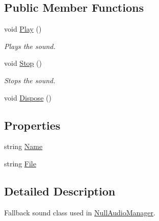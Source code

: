 \subsection*{Public Member Functions}
\begin{DoxyCompactItemize}
\item 
void \hyperlink{class_tri_devs_1_1_tri_engine_1_1_audio_1_1_null_sound_a470512e45c5a7bf069761de5ede5f7e4}{Play} ()
\begin{DoxyCompactList}\small\item\em Plays the sound. \end{DoxyCompactList}\item 
void \hyperlink{class_tri_devs_1_1_tri_engine_1_1_audio_1_1_null_sound_abc5395c18bd298050278547353548b56}{Stop} ()
\begin{DoxyCompactList}\small\item\em Stops the sound. \end{DoxyCompactList}\item 
void \hyperlink{class_tri_devs_1_1_tri_engine_1_1_audio_1_1_null_sound_a4ce71904b5e67108ca4de8b63e8d0fdd}{Dispose} ()
\end{DoxyCompactItemize}
\subsection*{Properties}
\begin{DoxyCompactItemize}
\item 
string \hyperlink{class_tri_devs_1_1_tri_engine_1_1_audio_1_1_null_sound_afa85eab8bcc6d17d162cab5b98937304}{Name}
\item 
string \hyperlink{class_tri_devs_1_1_tri_engine_1_1_audio_1_1_null_sound_aef0aa0ab4f1425b7e5d4144974496aeb}{File}
\end{DoxyCompactItemize}


\subsection{Detailed Description}
Fallback sound class used in \hyperlink{class_tri_devs_1_1_tri_engine_1_1_audio_1_1_null_audio_manager}{Null\-Audio\-Manager}. 



